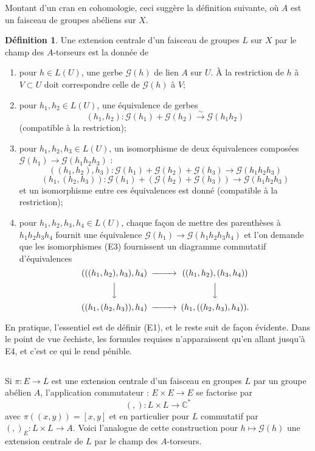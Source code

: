 \documentclass[12pt,a4paper]{article}
\theoremstyle{plain}
\theoremstyle{definition}
\newtheorem{definition}[theorem]{Définition}
\theoremstyle{remark}
\newcommand{\C}{\mathbb{C}}
\begin{document}
Montant d'un cran en cohomologie, ceci suggère la définition suivante, où $A$ est
un faisceau de groupes abéliens sur $X$.

\begin{definition}
Une extension centrale d'un faisceau de groupes $L$ sur $X$ par le champ
des $A$-torseurs est la donnée de
\begin{enumerate}[label=(E\arabic*)]
\item pour $h \in L(U)$, une gerbe $\mathscr{G}(h)$ de lien $A$ sur $U$. À la restriction de $h$ à $V \subset U$ doit
correspondre celle de $\mathscr{G}(h)$ à $V$;
\item pour $h_1, h_2 \in L(U)$, une équivalence de gerbes
\[
(h_1, h_2) : \mathscr{G}(h_1) + \mathscr{G}(h_2) \xrightarrow{\sim} \mathscr{G}(h_1 h_2)
\]
(compatible à la restriction);
\item pour $h_1, h_2, h_3 \in L(U)$, un isomorphisme de deux équivalences composées $\mathscr{G}(h_1) \to \mathscr{G}(h_1 h_2 h_3)$ :
\[
((h_1, h_2), h_3) : \mathscr{G}(h_1) + \mathscr{G}(h_2) + \mathscr{G}(h_3) \to \mathscr{G}(h_1 h_2 h_3)
\]
\[
(h_1, (h_2, h_3)) : \mathscr{G}(h_1) + (\mathscr{G}(h_2) + \mathscr{G}(h_3)) \to \mathscr{G}(h_1 h_2 h_3)
\]
et un isomorphisme entre ces équivalences est donné (compatible à la restriction);
\item pour $h_1, h_2, h_3, h_4 \in L(U)$, chaque façon de mettre des parenthèses à $h_1 h_2 h_3 h_4$
fournit une équivalence $\mathscr{G}(h_1) \to \mathscr{G}(h_1 h_2 h_3 h_4)$ et l'on demande que les isomorphismes (E3)
fournissent un diagramme commutatif d'équivalences
\[
\begin{CD}
(((h_1, h_2), h_3), h_4) @>>> ((h_1, h_2), (h_3, h_4)) \\
@VVV @VVV \\
((h_1, (h_2, h_3)), h_4) @>>> (h_1, ((h_2, h_3), h_4)).
\end{CD}
\]
\end{enumerate}
\end{definition}

En pratique, l'essentiel est de définir (E1), et le reste suit de façon évidente. Dans
le point de vue čechiste, les formules requises n'apparaissent qu'en allant jusqu'à E4,
et c'est ce qui le rend pénible.

\subsection{}

Si $\pi : E \to L$ est une extension centrale d'un faisceau en groupes $L$ par un
groupe abélien $A$, l'application commutateur : $E \times E \to E$ se factorise par
\[
(,) : L \times L \to \C^*
\]
avec $\pi((x,y)) = [x,y]$ et en particulier pour $L$ commutatif par $(,)_E : L \times L \to A$.
Voici l'analogue de cette construction pour $h \mapsto \mathscr{G}(h)$ une extension centrale de $L$ par
le champ des $A$-torseurs.
\end{document}
